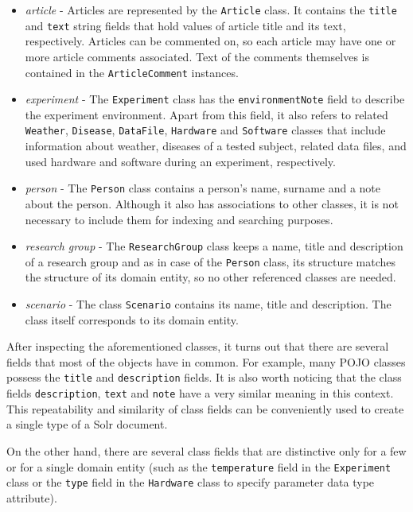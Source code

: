 \begin{itemize}
	\item \textit{article} - Articles are represented by the \texttt{Article} class. 
	It contains the \texttt{title} and \texttt{text} string fields  that hold values of article title and its text, respectively. 
	Articles can be commented on, so each article may have one or more article comments associated. Text of the comments themselves is contained in the \texttt{ArticleComment} instances. 
	
	\item \textit{experiment} - The \texttt{Experiment} class has the \texttt{environmentNote} field to describe the experiment environment.
	Apart from this field, it also refers to related \texttt{Weather}, \texttt{Disease}, \texttt{DataFile}, \texttt{Hardware} and \texttt{Software} classes that include information about weather, diseases of a tested subject, related data files, and used hardware and software during an experiment, respectively.
	
	\item \textit{person} - The \texttt{Person} class contains a person's name, surname and a note about the person. Although it also has associations to other classes, it is not necessary to include them for indexing and searching purposes.
	
	\item \textit{research group} - The \texttt{ResearchGroup} class keeps a name, title and description of a research group and as in case of the \texttt{Person} class, its structure matches the structure of its domain entity, so no other referenced classes are needed.
	
	\item \textit{scenario} - The class \texttt{Scenario} contains its name, title and description. The class itself corresponds to its domain entity.
\end{itemize}


After inspecting the aforementioned classes, it turns out that there are several fields that most of the objects have in common.
For example, many POJO classes possess the \texttt{title} and \texttt{description} fields.
It is also worth noticing that the class fields \texttt{description}, \texttt{text} and \texttt{note} have a very similar meaning in this context.
This repeatability and similarity of class fields can be conveniently used to create a single type of a Solr document.

On the other hand, there are several class fields that are distinctive only for a few or for a single domain entity (such as the \texttt{temperature} field in the \texttt{Experiment} class or the \texttt{type} field in the \texttt{Hardware} class to specify parameter data type attribute).

